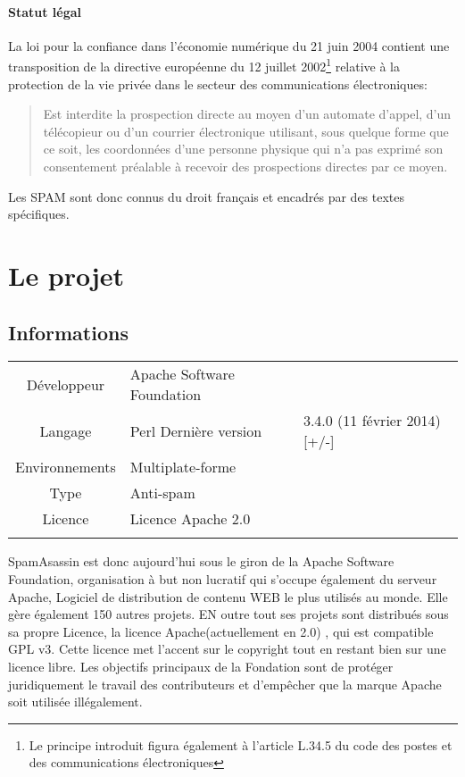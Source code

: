 \documentclass[a4paper,11pt]{article}
\begin{document}
\paragraph{Statut légal}


La loi pour la confiance dans l'économie numérique du 21 juin 2004 contient une transposition de la
directive européenne du 12 juillet 2002\footnote{Le principe introduit figura également à l'article L.34.5 du code 
des postes et des communications électroniques } relative à la protection de la vie privée dans le secteur des communications
électroniques:
\begin{quote}
 Est interdite la prospection directe au moyen d'un automate d'appel, d'un télécopieur ou d'un courrier électronique utilisant,
 sous quelque forme que ce soit, les coordonnées d'une personne physique qui n'a pas exprimé son consentement préalable à recevoir
 des prospections directes par ce moyen. 
\end{quote}
Les SPAM sont donc connus du droit français et encadrés par des textes spécifiques.

\section{Le projet}

\subsection{Informations}


\begin{center}
\begin{tabular}{cll}
\hline
Développeur & Apache Software Foundation  \\
Langage & Perl 
Dernière version & 3.4.0 (11 février 2014) [+/-] \\
Environnements & Multiplate-forme  \\
Type & Anti-spam & \\
Licence & Licence Apache 2.0 \\ \\
\hline
\end{tabular}
\end{center}



SpamAsassin est donc aujourd'hui sous le giron de la Apache Software Foundation, organisation à but non lucratif qui
s'occupe également du serveur Apache, Logiciel de distribution de contenu WEB le plus utilisés au monde. 
Elle gère également 150 autres projets.
EN outre tout ses projets sont distribués sous sa propre Licence, la licence Apache(actuellement en 2.0) , qui est compatible GPL v3.
Cette licence met l’accent sur le copyright tout en restant bien sur une licence libre. Les objectifs principaux de la Fondation sont de protéger 
juridiquement le travail des contributeurs et d'empêcher que la marque Apache soit utilisée illégalement.
\end{document}
